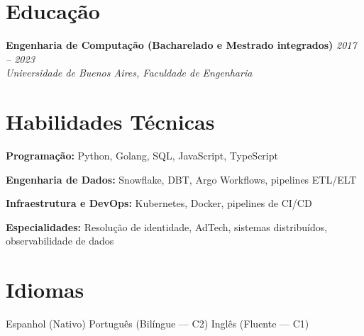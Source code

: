 \documentclass[10pt,a4paper]{article}
\newcommand{\cventry}[3]{%
  \textbf{#1} \hfill \textit{#3}\\[3pt]
  \textit{#2}%
}
\begin{document}
\section*{Educação}

\cventry{Engenharia de Computação (Bacharelado e Mestrado integrados)}%
  {Universidade de Buenos Aires, Faculdade de Engenharia}{2017 -- 2023}

\section*{Habilidades Técnicas}

\textbf{Programação:} Python, Golang, SQL, JavaScript, TypeScript

\textbf{Engenharia de Dados:} Snowflake, DBT, Argo Workflows, pipelines ETL/ELT

\textbf{Infraestrutura e DevOps:} Kubernetes, Docker, pipelines de CI/CD

\textbf{Especialidades:} Resolução de identidade, AdTech, sistemas distribuídos,
observabilidade de dados

\section*{Idiomas}

Espanhol (Nativo)
\quad\textperiodcentered\quad Português (Bilíngue --- C2)
\quad\textperiodcentered\quad Inglês (Fluente --- C1)
\end{document}
